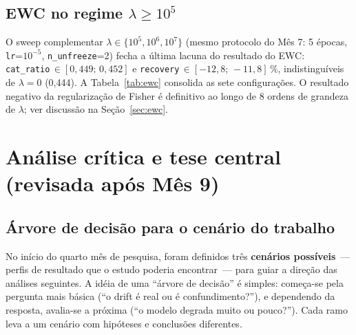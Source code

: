 \documentclass[11pt,a4paper]{article}
\begin{document}
\subsection{EWC no regime $\lambda\!\geq\!10^5$}

O sweep complementar $\lambda\!\in\!\{10^5, 10^6, 10^7\}$ (mesmo
protocolo do M\^es 7: 5 \'epocas, \texttt{lr}=$10^{-5}$,
\texttt{n\_unfreeze}=2) fecha a \'ultima lacuna do resultado do EWC:
\texttt{cat\_ratio}\,$\in [0{,}449;\,0{,}452]$ e
\texttt{recovery}\,$\in [-12{,}8;\,-11{,}8]\,\%$, indistingu\'iveis de
$\lambda\!=\!0$ (0{,}444). A Tabela~\ref{tab:ewc} consolida as sete
configura\c{c}\~oes. O resultado negativo da regulariza\c{c}\~ao de
Fisher \'e definitivo ao longo de 8 ordens de grandeza de $\lambda$;
ver discuss\~ao na Se\c{c}\~ao~\ref{sec:ewc}.

\section{An\'alise cr\'itica e tese central (revisada ap\'os M\^es 9)}

\subsection{\'Arvore de decis\~ao para o cen\'ario do trabalho}

No in\'icio do quarto m\^es de pesquisa, foram definidos tr\^es \textbf{cen\'arios poss\'iveis}~--- perfis de resultado que o estudo poderia encontrar~--- para guiar a dire\c{c}\~ao das an\'alises seguintes. A id\'eia de uma ``\'arvore de decis\~ao'' \'e simples: come\c{c}a-se pela pergunta mais b\'asica (``o drift \'e real ou \'e confundimento?''), e dependendo da resposta, avalia-se a pr\'oxima (``o modelo degrada muito ou pouco?''). Cada ramo leva a um cen\'ario com hip\'oteses e conclus\~oes diferentes.
\end{document}
